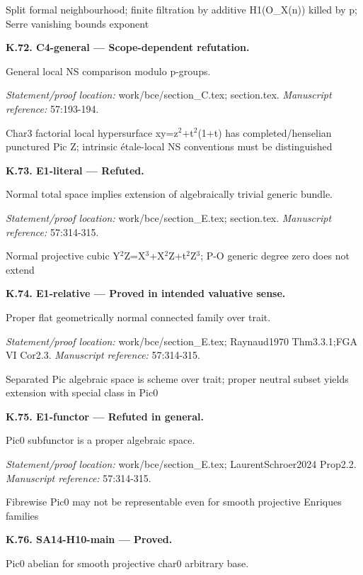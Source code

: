 \par Split formal neighbourhood; finite filtration by additive H1(O\_X(n)) killed by p; Serre vanishing bounds exponent
\par\medskip\noindent\textbf{K.72. C4-general --- Scope-dependent refutation.}\par
General local NS comparison modulo p-groups.
\par\emph{Statement/proof location:} work/bce/section\_C.tex; section.tex.
\emph{Manuscript reference:} 57:193-194.
\par Char3 factorial local hypersurface xy=z\ensuremath{{}^2}+t\ensuremath{{}^2}(1+t) has completed/henselian punctured Pic Z; intrinsic étale-local NS conventions must be distinguished
\par\medskip\noindent\textbf{K.73. E1-literal --- Refuted.}\par
Normal total space implies extension of algebraically trivial generic bundle.
\par\emph{Statement/proof location:} work/bce/section\_E.tex; section.tex.
\emph{Manuscript reference:} 57:314-315.
\par Normal projective cubic Y\ensuremath{{}^2}Z=X\ensuremath{{}^3}+X\ensuremath{{}^2}Z+t\ensuremath{{}^2}Z\ensuremath{{}^3}; P-O generic degree zero does not extend
\par\medskip\noindent\textbf{K.74. E1-relative --- Proved in intended valuative sense.}\par
Proper flat geometrically normal connected family over trait.
\par\emph{Statement/proof location:} work/bce/section\_E.tex; Raynaud1970 Thm3.3.1;FGA VI Cor2.3.
\emph{Manuscript reference:} 57:314-315.
\par Separated Pic algebraic space is scheme over trait; proper neutral subset yields extension with special class in Pic0
\par\medskip\noindent\textbf{K.75. E1-functor --- Refuted in general.}\par
Pic0 subfunctor is a proper algebraic space.
\par\emph{Statement/proof location:} work/bce/section\_E.tex; LaurentSchroer2024 Prop2.2.
\emph{Manuscript reference:} 57:314-315.
\par Fibrewise Pic0 may not be representable even for smooth projective Enriques families
\par\medskip\noindent\textbf{K.76. SA14-H10-main --- Proved.}\par
Pic0 abelian for smooth projective char0 arbitrary base.
